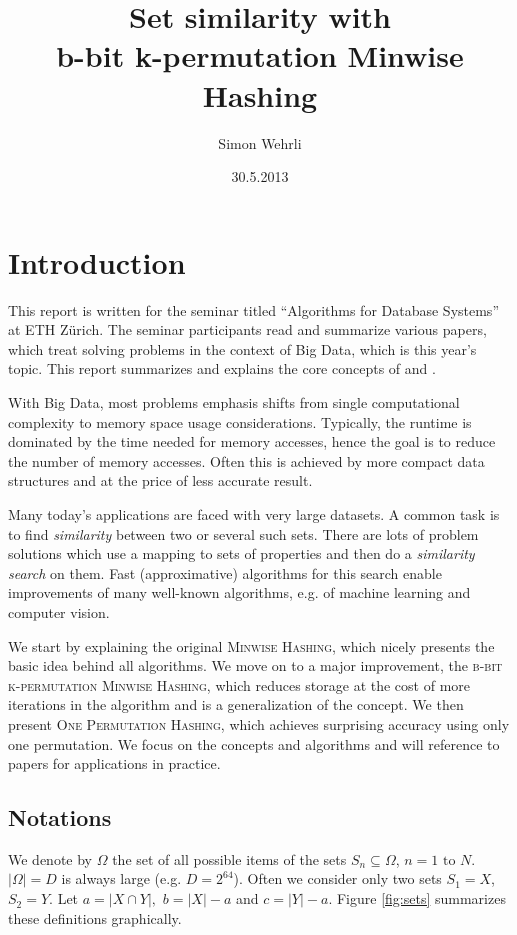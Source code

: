 \documentclass[a4paper]{article}
\author{Simon Wehrli}
\date{30.5.2013}
\title{Set similarity with\\ b-bit k-permutation Minwise Hashing}
\begin{document}
 
\maketitle

\section{Introduction}
This report is written for the seminar titled ``Algorithms for Database Systems'' at ETH Z\"{u}rich. The seminar participants read and summarize various papers, which treat solving problems in the context of Big Data, which is this year's topic. This report summarizes and explains the core concepts of \citep{LiK11} and \citep{LiOwZhang12}.

With Big Data, most problems emphasis shifts from single computational complexity to memory space usage considerations. Typically, the runtime is dominated by the time needed for memory accesses, hence the goal is to reduce the number of memory accesses. Often this is achieved by more compact data structures and at the price of less accurate result.

Many today's applications are faced with very large datasets. A common task is to find \emph{similarity} between two or several such sets. There are lots of problem solutions which use a mapping to sets of properties and then do a \emph{similarity search} on them. Fast (approximative) algorithms for this search enable improvements of many well-known algorithms, e.g. of machine learning and computer vision.

We start by explaining the original \textsc{Minwise Hashing}, which nicely presents the basic idea behind all algorithms. We move on to a major improvement, the \textsc{b-bit k-permutation Minwise Hashing}, which reduces storage at the cost of more iterations in the algorithm and is a generalization of the concept. We then present \textsc{One Permutation Hashing}, which achieves surprising accuracy using only one permutation. We focus on the concepts and algorithms and will reference to papers for applications in practice.

\subsection{Notations}

We denote by $\Omega$ the set of all possible items of the sets $S_n \subseteq \Omega$, $n = 1 \text{ to } N$. $\left| \Omega \right| = D$ is always large (e.g. $D=2^{64}$). Often we consider only two sets $S_1 = X$, $S_2 = Y$. Let $a=|X \cap Y|,$ $b=|X|-a$ and $c=|Y|-a$. Figure \vref{fig:sets} summarizes these definitions graphically.
\end{document}
